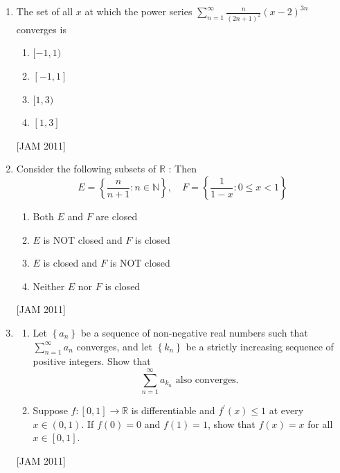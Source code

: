 \begin{enumerate}
\begin{enumerate}
\item $\operatorname{rank}\left(T_{1}\right)=n$ and $\operatorname{rank}\left(T_{2}\right)=m$ 
\item rank $\left(T_{1}\right)=m$ and $\operatorname{rank}\left(T_{2}\right)=n$ 
\item $\operatorname{rank}\left(T_{1}\right)=n$ and $\operatorname{rank}\left(T_{2}\right)=n$ 
\item $\operatorname{rank}\left(T_{1}\right)=m$ and $\operatorname{rank}\left(T_{2}\right)=m$
\end{enumerate}
\hfill [JAM 2011]



\item  The set of all $x$ at which the power series $\sum_{n=1}^{\infty} \frac{n}{(2 n+1)^{2}}(x-2)^{3 n}$ converges is 
\begin{enumerate}
    \item $[-1,1)$ 
\item $[-1,1]$ 
\item $[1,3)$ 
\item $[1,3]$ 

\end{enumerate}
\hfill [JAM 2011]


\item  Consider the following subsets of $\mathbb{R}$ :
Then
$$
E=\left\{\frac{n}{n+1}: n \in \mathbb{N}\right\}, \quad F=\left\{\frac{1}{1-x}: 0 \leq x<1\right\}
$$
\begin{enumerate}
    \item Both $E$ and $F$ are closed 
\item $E$ is NOT closed and $F$ is closed 
\item $E$ is closed and $F$ is NOT closed 
\item Neither $E$ nor $F$ is closed
\end{enumerate}
\hfill [JAM 2011]




\item  
\begin{enumerate}
    \item Let $\left\{a_{n}\right\}$ be a sequence of non-negative real numbers such that $\sum_{n=1}^{\infty} a_{n}$ converges, and let $\left\{k_{n}\right\}$ be a strictly increasing sequence of positive integers. Show that
$$
\sum_{n=1}^{\infty} a_{k_{n}} \text { also converges. }
$$
\item  Suppose $f:[0,1] \rightarrow \mathbb{R}$ is differentiable and $f^{\prime}(x) \leq 1$ at every $x \in(0,1)$. If $f(0)=0$ and $f(1)=1$, show that $f(x)=x$ for all $x \in[0,1]$.
\end{enumerate}
\hfill [JAM 2011]




\end{enumerate}

